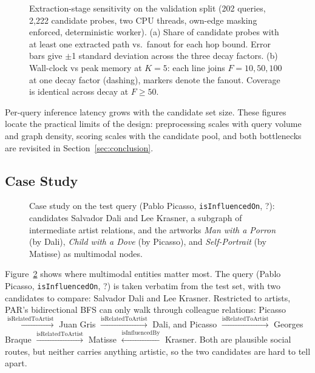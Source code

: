 \documentclass[runningheads]{llncs}
\begin{document}
\begin{figure}[t]
  \centering
  
  \caption{Extraction-stage sensitivity on the validation split (202
    queries, 2,222 candidate probes, two CPU threads, own-edge masking
    enforced, deterministic worker). (a) Share of candidate probes
    with at least one extracted path vs.\ fanout for each hop bound.
    Error bars give $\pm$1 standard deviation across the three decay
    factors. (b) Wall-clock vs peak memory at $K = 5$: each line joins
    $F = 10, 50, 100$ at one decay factor (dashing), markers denote the
    fanout. Coverage is identical across decay at $F \geq 50$.}
  \label{fig:bfs-sweep}
\end{figure}

Per-query inference latency grows with the candidate set size. These
figures locate the practical limits of the design: preprocessing scales
with query volume and graph density, scoring scales with the candidate
pool, and both bottlenecks are revisited in
Section~\ref{sec:conclusion}.

\subsection{Case Study}
\label{sec:case-study}

\begin{figure}[t]
  \centering
  
  \caption{Case study on the test query (Pablo Picasso,
    \texttt{isInfluencedOn}, ?): candidates Salvador Dali and
    Lee Krasner, a subgraph of intermediate artist relations, and
    the artworks \textit{Man with a Porron} (by Dali),
    \textit{Child with a Dove} (by Picasso), and \textit{Self-Portrait}
    (by Matisse) as multimodal nodes.}
  \label{fig:case-study}
\end{figure}

Figure~\ref{fig:case-study} shows where multimodal entities matter
most. The query (Pablo Picasso, \texttt{isInfluencedOn}, ?) is taken
verbatim from the test set, with two candidates to compare: Salvador
Dali and Lee Krasner. Restricted to artists, PAR's bidirectional BFS
can only walk through colleague relations: Picasso $\xrightarrow{\text{isRelatedToArtist}}$ Juan Gris $\xrightarrow{\text{isRelatedToArtist}}$ Dali, and Picasso $\xrightarrow{\text{isRelatedToArtist}}$ Georges Braque $\xrightarrow{\text{isRelatedToArtist}}$ Matisse $\xleftarrow{\text{isInfluencedBy}}$ Krasner. Both are plausible social routes, but neither carries anything artistic, so the two candidates are hard to tell apart.
\end{document}
